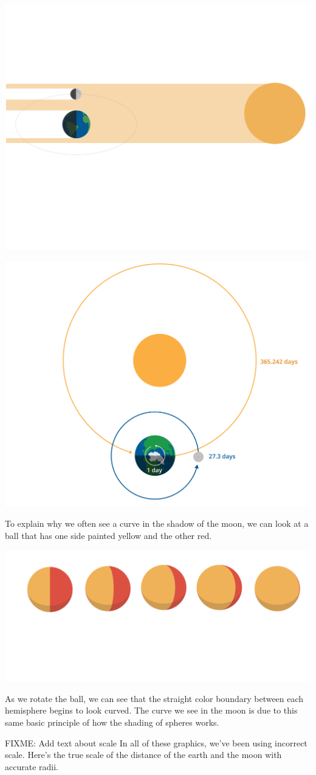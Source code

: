 \includegraphics[width=.7\textwidth]{moonspace.png}

\includegraphics[width=.7\textwidth]{earthSunMoon.png}




To explain why we often see a curve in the shadow of the moon, we can look at a ball that has one side painted yellow and the other red. 

\includegraphics[width=.5\textwidth]{circleShading.png}

As we rotate the ball, we can see that the straight color boundary between each hemisphere begins to look curved. The curve we see in the moon is due to this same basic principle of how the shading of spheres works.    

FIXME: Add text about scale
In all of these graphics, we’ve been using incorrect scale. Here’s the true scale of the distance of the earth and the moon with accurate radii. 

